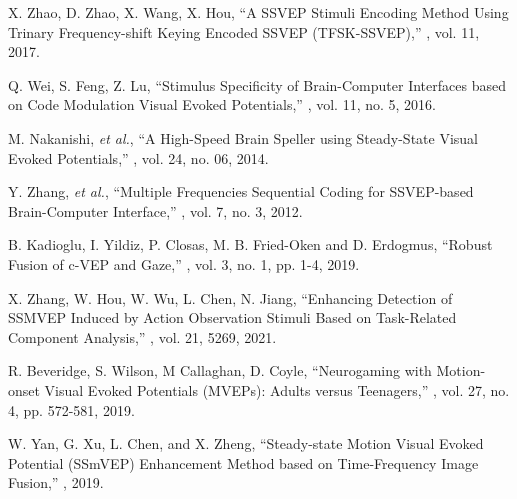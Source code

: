 \documentclass[sensors,accept,moreauthors,pdftex,10pt,a4paper]{mdpi}
\theoremstyle{mdpi}
\newcounter{ex}
\newcounter{re}
\theoremstyle{mdpidefinition}
\begin{document}
\begin{thebibliography}{10}

X. Zhao, D. Zhao, X. Wang, X. Hou,
\newblock ``A SSVEP Stimuli Encoding Method Using Trinary Frequency-shift Keying Encoded SSVEP (TFSK-SSVEP),''
, vol. 11, 2017.

Q. Wei, S. Feng, Z. Lu,
\newblock ``Stimulus Specificity of Brain-Computer Interfaces based on Code Modulation Visual Evoked Potentials,''
, vol. 11, no. 5, 2016.

M. Nakanishi, \textit{et al.},
\newblock ``A High-Speed Brain Speller using Steady-State Visual Evoked Potentials,''
, vol. 24, no. 06, 2014.

Y. Zhang, \textit{et al.},
\newblock ``Multiple Frequencies Sequential Coding for SSVEP-based Brain-Computer Interface,''
, vol. 7, no. 3, 2012.

B. Kadioglu,  I. Yildiz, P. Closas, M. B. Fried-Oken and D. Erdogmus,
\newblock ``Robust Fusion of c-VEP and Gaze,'' , vol. 3, no. 1, pp. 1-4, 2019.

X. Zhang, W. Hou, W. Wu, L. Chen, N. Jiang,
\newblock ``Enhancing Detection of SSMVEP Induced by Action Observation Stimuli Based on Task-Related Component Analysis,''
, vol. 21, 5269,  2021.

R. Beveridge, S. Wilson, M Callaghan, D. Coyle,
\newblock ``Neurogaming with Motion-onset Visual Evoked Potentials (MVEPs): Adults versus Teenagers,''
, vol. 27, no. 4, pp. 572-581, 2019.

W. Yan, G. Xu, L. Chen, and X. Zheng,
\newblock ``Steady-state Motion Visual Evoked Potential (SSmVEP) Enhancement Method based on Time-Frequency Image Fusion,''
, 2019.


\end{thebibliography}
\end{document}
